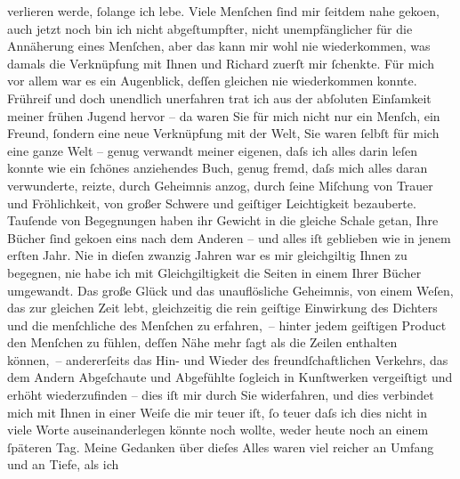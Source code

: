\begin{ledgroupsized}[t]{13cm}
               verlieren werde, ſolange ich lebe. Viele Menſchen ſind mir ſeitdem nahe geko{\geminationm}en, auch jetzt noch bin ich nicht abgeſtumpfter, nicht
               unempfänglicher für die Annäherung eines Menſchen, aber das kann mir wohl nie
               wiederkommen, was damals die Verknüpfung mit Ihnen und Richard zuerſt mir ſchenkte. Für mich \introOben{}vor allem\introOben{} war
               es ein Augenblick, deſſen {\pb}gleichen nie wiederkommen
               konnte. Frühreif und doch unendlich unerfahren trat ich aus der abſoluten Einſamkeit
               meiner frühen Jugend hervor – da waren Sie für mich nicht nur ein Menſch, ein Freund,
               ſondern eine neue Verknüpfung mit der Welt, Sie waren ſelbſt für mich eine ganze Welt
               –  genug verwandt meiner eigenen, daſs ich alles
               darin leſen konnte wie ein ſchönes anziehendes Buch, genug fremd, daſs mich alles
               daran verwunderte, reizte, durch Geheimnis anzog, durch ſeine Miſchung von Trauer und
               Fröhlichkeit, von großer Schwere und geiſtiger Leichtigkeit bezauberte. Tauſende von
               Begegnungen haben ihr Gewicht in die gleiche Schale getan, Ihre Bücher ſind geko{\geminationm}en eins nach dem Anderen – und alles iſt geblieben wie
               in jenem erſten Jahr. Nie in dieſen zwanzig Jahren war es mir gleichgiltig Ihnen zu
               begegnen, nie habe ich mit Gleichgiltigkeit die Seiten in einem Ihrer Bücher
               umgewandt.\pend
           \pstart
           {\pb}Das große Glück und das unauflösliche Geheimnis, von
               einem Weſen, das zur gleichen Zeit lebt, gleichzeitig die rein geiſtige Einwirkung
               des Dichters und die menſchliche des Menſchen zu erfahren, – hinter jedem geiſtigen
               Product den Menſchen zu fühlen, deſſen Nähe mehr ſagt als die Zeilen enthalten
               können, – andererſeits das Hin- und Wieder des freundſchaftlichen Verkehrs, das dem
               Andern Abgeſchaute und Abgefühlte ſogleich in Kunſtwerken vergeiſtigt und erhöht
               wiederzufinden – dies iſt mir durch Sie widerfahren, und dies verbindet mich mit
               Ihnen in einer Weiſe die mir teuer iſt, ſo teuer daſs ich dies nicht in viele Worte
               auseinanderlegen könnte noch wollte, weder heute noch an einem ſpäteren Tag.\pend
           \pstart
           Meine Gedanken über dieſes Alles waren viel reicher an Umfang und an Tiefe, als ich

\end{ledgroupsized}
